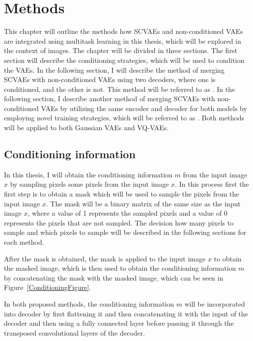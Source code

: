 \chapter{Methods}

This chapter will outline the methods how SCVAEs and non-conditioned VAEs are
integrated using multitask learning in this thesis, which will be explored in
the context of images. The chapter will be divided in three sections. The first
section will describe the conditioning strategies, which will be used to
condition the VAEs. In the following section, I will describe the method of
merging SCVAEs with non-conditioned VAEs using two decoders, where one is
conditioned, and the other is not. This method will be referred to as
. In the following section, I describe another method of merging
SCVAEs with non-conditioned VAEs by utilizing the same encoder and decoder for
both models by employing novel training strategies, which will be referred to
as . Both methods will be applied to both Gaussian VAEs and VQ-VAEs.

\section{Conditioning information}

In this thesis, I will obtain the conditioning information $m$ from the input
image $x$ by sampling pixels some pixels from the input image $x$. In this
process first the first step is to obtain a mask which will be used to sample
the pixels from the input image $x$. The mask will be a binary matrix of the
same size as the input image $x$, where a value of 1 represents the sampled
pixels and a value of 0 represents the pixels that are not sampled. The
decision how many pixels to sample and which pixels to sample will be described
in the following sections for each method.

After the mask is obtained, the mask is applied to the input image $x$ to
obtain the masked image, which is then used to obtain the conditioning
information $m$ by concatenating the mask with the masked image, which can be
seen in Figure~\ref{ConditioningFigure}.

In both proposed methods, the conditioning information $m$ will be incorporated
into decoder by first flattening it and then concatenating it with the input of the decoder and then using a fully connected layer before passing it through the transposed convolutional layers of the decoder.

